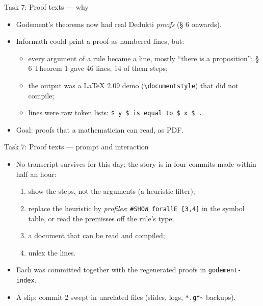 \documentclass[10pt,aspectratio=169]{beamer}
\begin{document}
\begin{frame}{Task 7: Proof texts --- why}
  \begin{itemize}
    \item Godement's theorems now had real Dedukti \emph{proofs} (§ 6 onwards).
    \item Informath could print a proof as numbered lines, but:
      \begin{itemize}\small
        \item every argument of a rule became a line, mostly
              ``there is a proposition'': § 6 Theorem 1 gave 46 lines, 14 of them steps;
        \item the output was a LaTeX 2.09 demo (\texttt{\textbackslash documentstyle})
              that did not compile;
        \item lines were raw token lists: \texttt{\$ y \$ is equal to \$ x \$ .}
      \end{itemize}
    \item Goal: proofs that a mathematician can read, as PDF.
  \end{itemize}
\end{frame}

\begin{frame}{Task 7: Proof texts --- prompt and interaction}
  \begin{itemize}
    \item No transcript survives for this day; the story is in four commits
          made within half an hour:
      \begin{enumerate}\small
        \item show the steps, not the arguments (a heuristic filter);
        \item replace the heuristic by \emph{profiles}:
              \texttt{\#SHOW forallE [3,4]} in the symbol table, or read the
              premisses off the rule's type;
        \item a document that can be read and compiled;
        \item unlex the lines.
      \end{enumerate}
    \item Each was committed together with the regenerated proofs in
          \texttt{godement-index}.
    \item A slip: commit 2 swept in unrelated files (slides, logs,
          \texttt{*.gf\textasciitilde} backups).
  \end{itemize}
\end{frame}
\end{document}
